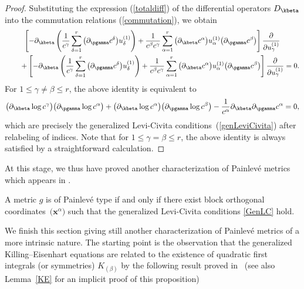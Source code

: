 \begin{proof}Substituting the expression (\ref{totaldiff}) of the differential operators $D_{\kbeta}$ into the commutation relations (\ref{commutation}), we obtain
 \begin{gather*}
 \left[-\partial_{\kbeta}\left(\frac{1}{c^{\gamma}}\sum_{\delta =1}^{r}\big(\partial_{\pgamma} c^{\delta}\big)u^{(1)}_{\delta}\right) + \frac{1}{c^{\beta} c^{\gamma}}\sum_{\alpha =1}^{r}\big(\partial_{\kbeta} c^{\alpha}\big)u^{(1)}_{\alpha}\big(\partial_{\pgamma} c^{\beta}\big)\right]\frac{\partial}{\partial u^{(1)}_{\gamma}} \\
 \qquad{} +
 \left[-\partial_{\kbeta}\left(\frac{1}{c^{\gamma}}\sum_{\delta =1}^{r}\big(\partial_{\pgamma} c^{\delta}\big)u^{(1)}_{\delta}\right)+\frac{1}{c^{\beta}c^{\gamma}}\sum_{\alpha =1}^{r}\big(\partial_{\kbeta}c^{\alpha}\big)u^{(1)}_{\alpha}\big(\partial_{\pgamma} c^{\beta}\big)\right]\frac{\partial}{\partial u^{(1)}_{\gamma}}=0.
 \end{gather*}
For $1\leq \gamma \neq \beta \leq r$, the above identity is equivalent to
\begin{gather} \label{GenLC}
\big(\partial_{\kbeta} \log c^{\gamma}\big)\big(\partial_{\pgamma} \log c^{\alpha}\big)+\big(\partial_{\kbeta} \log c^{\alpha}\big)\big(\partial_{\pgamma} \log c^{\beta}\big)-\frac{1}{c^{\alpha}}\partial_{\kbeta}\partial_{\pgamma}c^{\alpha}=0,
\end{gather}
which are precisely the generalized Levi-Civita conditions~(\ref{genLeviCivita}) after relabeling of indices. Note that for $1\leq \gamma = \beta \leq r$, the above identity is always satisfied by a straightforward calculation.
\end{proof}

At this stage, we thus have proved another characterization of Painlev\'e metrics which appears in \cite[p.~12]{CR2019}.

\begin{Proposition} \label{PainLC}A metric $g$ is of Painlev\'e type if and only if there exist block orthogonal coordinates~$\big(\textbf{x}^\alpha\big)$ such that the generalized Levi-Civita conditions \eqref{GenLC} hold.
\end{Proposition}

We finish this section giving still another characterization of Painlev\'e metrics of a more intrinsic nature. The starting point is the observation that the generalized Killing--Eisenhart equations are related to the existence of quadratic first integrals (or symmetries) $K_{(\beta)}$ by the following result proved in~\cite[Proposition~5.3]{CR2019} (see also Lemma~\ref{KE} for an implicit proof of this proposition)

